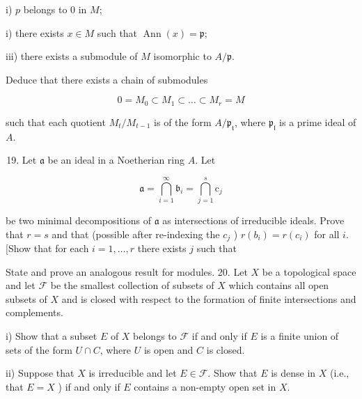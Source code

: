 \documentclass{standalone}
\theoremstyle{definition}
\theoremstyle{remark}
\begin{document}
i) $p$ belongs to 0 in $M$;

i) there exists $x \in M$ such that $\operatorname{Ann}(x)=\mathfrak{p}$;

iii) there exists a submodule of $M$ isomorphic to $A / \mathfrak{p}$.

Deduce that there exists a chain of submodules

\[
0=M_{0} \subset M_{1} \subset \ldots \subset M_{r}=M
\]

such that each quotient $M_{t} / M_{t-1}$ is of the form $A / \mathfrak{p}_{\mathfrak{t}}$, where $\mathfrak{p}_{\mathfrak{l}}$ is a prime ideal of $A$.

\begin{enumerate}
  \setcounter{enumi}{18}
  \item Let $\mathfrak{a}$ be an ideal in a Noetherian ring $A$. Let
\end{enumerate}

\[
\mathfrak{a}=\bigcap_{i=1}^{\infty} \mathfrak{b}_{i}=\bigcap_{j=1}^{s} \mathrm{c}_{j}
\]

be two minimal decompositions of $\mathfrak{a}$ as intersections of irreducible ideals. Prove that $r=s$ and that (possible after re-indexing the $c_{j}$ ) $r\left(b_{i}\right)=r\left(c_{i}\right)$ for all $i$. [Show that for each $i=1, \ldots, r$ there exists $j$ such that

\begin{center}
\end{center}

State and prove an analogous result for modules. 20. Let $X$ be a topological space and let $\mathscr{F}$ be the smallest collection of subsets of $X$ which contains all open subsets of $X$ and is closed with respect to the formation of finite intersections and complements.

i) Show that a subset $E$ of $X$ belongs to $\mathscr{F}$ if and only if $E$ is a finite union of sets of the form $U \cap C$, where $U$ is open and $C$ is closed.

ii) Suppose that $X$ is irreducible and let $E \in \mathscr{F}$. Show that $E$ is dense in $X$ (i.e., that $E=X$ ) if and only if $E$ contains a non-empty open set in $X$.
\end{document}
